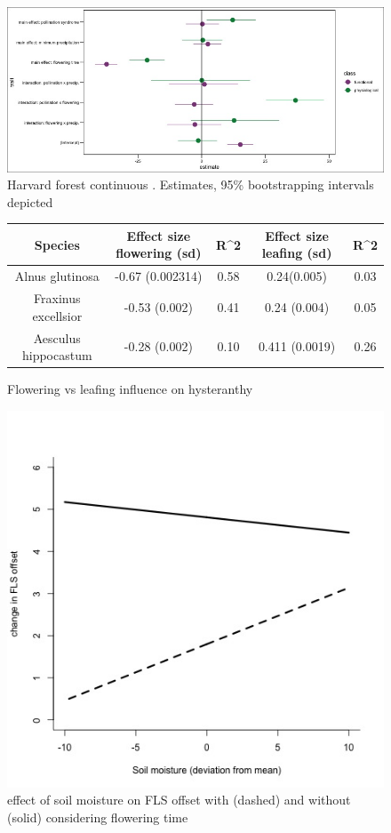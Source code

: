 \documentclass[12pt]{article}\usepackage[]{graphicx}\usepackage[]{color}
\begin{document}
     \begin{figure}
    \centering
    \includegraphics[width=\textwidth]{..//figure/HF_cont_effectsize.jpeg}
    \caption{Harvard forest continuous . Estimates, 95\% bootstrapping intervals depicted}
    \label{fig:Figure 6}
    \end{figure}
    
   
\begin{figure}[h!]
\begin{tabular}[width=\textwidth]{|c|c|c|c|c|}
\hline
Species&Effect size flowering (sd)&R^2&Effect size leafing (sd)&R^2\\
\hline
Alnus glutinosa&-0.67 (0.002314) &0.58&0.24(0.005)&0.03\\
Fraxinus excellsior&-0.53 (0.002)&0.41&0.24 (0.004)&0.05\\
Aesculus hippocastum& -0.28 (0.002)&0.10&0.411 (0.0019)&0.26 \\
\hline
\end{tabular}
    \caption{Flowering vs leafing influence on hysteranthy}
    \label{fig:Figure 7}
    \end{figure}
    
        \begin{figure}[h!]
    \centering
    \includegraphics[width=\textwidth]{..//figure/SM_comp.jpeg}
    \caption{effect of soil moisture on FLS offset with (dashed) and without (solid) considering flowering time}
    \label{fig:Figure 8}
    \end{figure}
\end{document}
